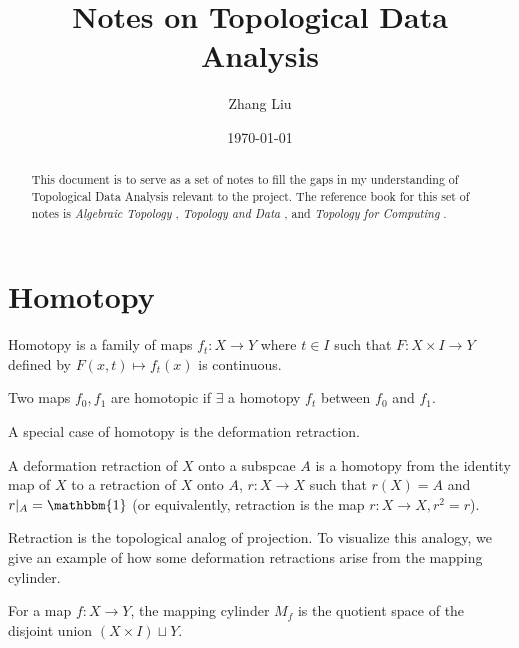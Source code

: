\documentclass[11pt,reqno,oneside,a4paper]{article}
\author{Zhang Liu}
\title{Notes on Topological Data Analysis}
\date{\today}
\begin{document}
\maketitle
\thispagestyle{fancy}

\begin{abstract}
    This document is to serve as a set of notes to fill the gaps in my understanding of Topological Data Analysis relevant to the project. The reference book for this set of notes is \textit{Algebraic Topology} \cite{Hat2002a}, \textit{Topology and Data} \cite{Car2009a}, and \textit{Topology for Computing} \cite{Zom2005a}.
\end{abstract}


\section{Homotopy} \label{sec:homotopy}

\begin{defn}
	Homotopy is a family of maps $f_t: X \to Y$ where $t \in I$ such that $F: X\times I \to Y$ defined by $F(x,t) \mapsto f_t(x)$ is continuous.
\end{defn}

\begin{defn}
	Two maps $f_0, f_1$ are homotopic if $\exists$ a homotopy $f_t$ between $f_0$ and $f_1$.  
\end{defn}

A special case of homotopy is the deformation retraction. 

\begin{defn}
	A deformation retraction of $X$ onto a subspcae $A$ is a homotopy from the identity map of $X$ to a retraction of $X$ onto $A$, $r: X\to X$ such that $r(X) = A$ and $r|_A = \mathbbm{1}$ (or equivalently, retraction is the map $r: X\to X, r^2 =r$). 
\end{defn}

Retraction is the topological analog of projection. To visualize this analogy, we give an example of how some deformation retractions arise from the mapping cylinder.

\begin{defn}
	For a map $f: X\to Y$, the mapping cylinder $M_f$ is the quotient space of the disjoint union $(X \times I) \sqcup Y$.
\end{defn}



{\small}
\end{document}
